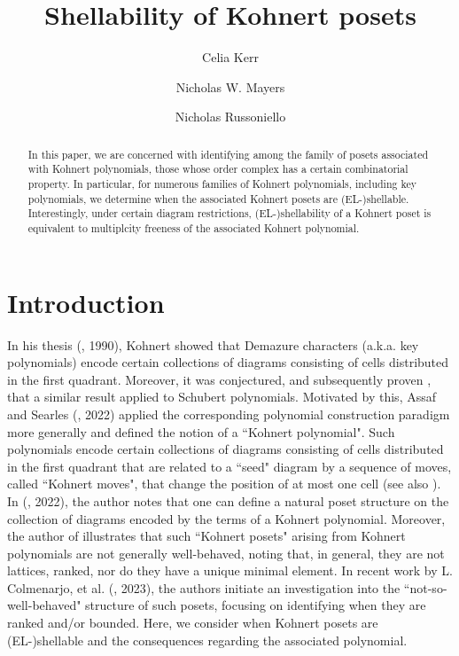 \documentclass[letterpaper,10pt]{article}
\begin{document}
\title{Shellability of Kohnert posets}
\author[*]{Celia Kerr}
\author[**]{Nicholas W. Mayers}
\author[*]{Nicholas Russoniello}





\maketitle

\begin{abstract} 
\noindent
In this paper, we are concerned with identifying among the family of posets associated with Kohnert polynomials, those whose order complex has a certain combinatorial property. In particular, for numerous families of Kohnert polynomials, including key polynomials, we determine when the associated Kohnert posets are (EL-)shellable. Interestingly, under certain diagram restrictions, (EL-)shellability of a Kohnert poset is equivalent to multiplcity freeness of the associated Kohnert polynomial.
\end{abstract}

\section{Introduction}

In his thesis (\textbf{\cite{Kohnert}}, 1990), Kohnert showed that Demazure characters (a.k.a. key polynomials) encode certain collections of diagrams consisting of cells distributed in the first quadrant. Moreover, it was conjectured, and subsequently proven \textbf{\cite{AssafSchu, Winkel2, Winkel1}}, that a similar result applied to Schubert polynomials. Motivated by this, Assaf and Searles (\textbf{\cite{KP1}}, 2022) applied the corresponding polynomial construction paradigm more generally and defined the notion of a ``Kohnert polynomial". Such polynomials encode certain collections of diagrams consisting of cells distributed in the first quadrant that are related to a ``seed" diagram by a sequence of moves, called ``Kohnert moves", that change the position of at most one cell (see also \textbf{\cite{KP2}}). In (\textbf{\cite{KP2}}, 2022), the author notes that one can define a natural poset structure on the collection of diagrams encoded by the terms of a Kohnert polynomial. Moreover, the author of \textbf{\cite{KP2}} illustrates that such ``Kohnert posets" arising from Kohnert polynomials are not generally well-behaved, noting that, in general, they are not lattices, ranked, nor do they have a unique minimal element. In recent work by L. Colmenarjo, et al. (\textbf{\cite{KPoset1}}, 2023), the authors initiate an investigation into the ``not-so-well-behaved" structure of such posets, focusing on identifying when they are ranked and/or bounded. Here, we consider when Kohnert posets are (EL-)shellable and the consequences regarding the associated polynomial.
\end{document}
